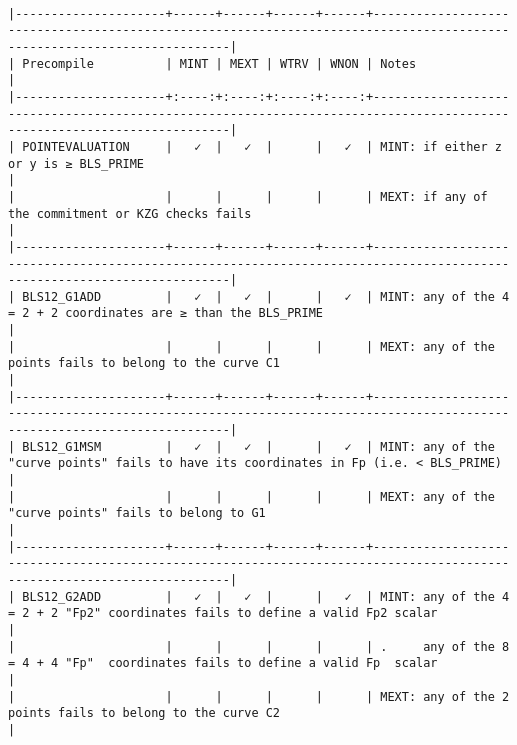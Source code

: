 \documentclass[varwidth=\maxdimen,margin=0.5cm,multi={verbatim}]{standalone}
\begin{document}
\begin{verbatim}

|---------------------+------+------+------+------+------------------------------------------------------------------------------------------------------------------------|
| Precompile          | MINT | MEXT | WTRV | WNON | Notes                                                                                                                  |
|---------------------+:----:+:----:+:----:+:----:+------------------------------------------------------------------------------------------------------------------------|
| POINTEVALUATION     |   ✓  |   ✓  |      |   ✓  | MINT: if either z or y is ≥ BLS_PRIME                                                                                  |
|                     |      |      |      |      | MEXT: if any of the commitment or KZG checks fails                                                                     |
|---------------------+------+------+------+------+------------------------------------------------------------------------------------------------------------------------|
| BLS12_G1ADD         |   ✓  |   ✓  |      |   ✓  | MINT: any of the 4 = 2 + 2 coordinates are ≥ than the BLS_PRIME                                                        |
|                     |      |      |      |      | MEXT: any of the points fails to belong to the curve C1                                                                |
|---------------------+------+------+------+------+------------------------------------------------------------------------------------------------------------------------|
| BLS12_G1MSM         |   ✓  |   ✓  |      |   ✓  | MINT: any of the "curve points" fails to have its coordinates in Fp (i.e. < BLS_PRIME)                                 |
|                     |      |      |      |      | MEXT: any of the "curve points" fails to belong to G1                                                                  |
|---------------------+------+------+------+------+------------------------------------------------------------------------------------------------------------------------|
| BLS12_G2ADD         |   ✓  |   ✓  |      |   ✓  | MINT: any of the 4 = 2 + 2 "Fp2" coordinates fails to define a valid Fp2 scalar                                        |
|                     |      |      |      |      | .     any of the 8 = 4 + 4 "Fp"  coordinates fails to define a valid Fp  scalar                                        |
|                     |      |      |      |      | MEXT: any of the 2 points fails to belong to the curve C2                                                              |

\end{verbatim}
\end{document}
